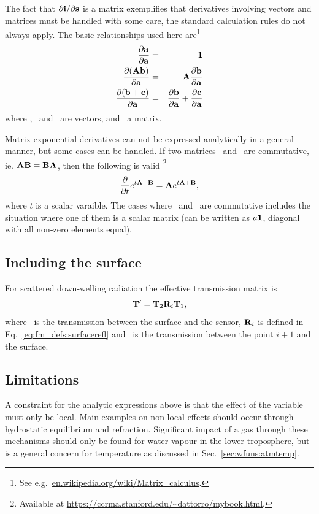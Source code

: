 The fact that $\partial\mathbf{i}/\partial{\bf s}$ is a matrix exemplifies that
derivatives involving vectors and matrices must be handled with some care, the
standard calculation rules do not always apply. The basic relationships used
here are\footnote{See e.g.\ \url{en.wikipedia.org/wiki/Matrix_calculus}.}
\begin{eqnarray}
  \frac{\partial\mathbf{a}}{\partial\mathbf{a}} &=& 
    \mathbf{1} \\
  \frac{\partial(\mathbf{A}\mathbf{b})}{\partial\mathbf{a}} &=& 
    \mathbf{A}\frac{\partial\mathbf{b}}{\partial\mathbf{a}} \\
  \frac{\partial(\mathbf{b}+\mathbf{c})}{\partial\mathbf{a}} &=& 
    \frac{\partial\mathbf{b}}{\partial\mathbf{a}}+
    \frac{\partial\mathbf{c}}{\partial\mathbf{a}}
\end{eqnarray}
where , \ and \ are vectors, and \ a
matrix.

Matrix exponential derivatives can not be expressed analytically in a general
manner, but some cases can be handled. If two matrices \ and
\ are commutative, ie. $\mathbf{A}\mathbf{B}=\mathbf{B}\mathbf{A}$,
then the following is valid \citep{Dattorro2011}\footnote{Available at
  \url{https://ccrma.stanford.edu/~dattorro/mybook.html}.}
\begin{equation}
  \label{eq:expmder}
  \frac{\partial}{\partial t} e^{t\mathbf{A}+\mathbf{B}} = 
       \mathbf{A}e^{t\mathbf{A}+\mathbf{B}},
\end{equation}
where $t$ is a scalar varaible.
The cases where \ and \ are commutative includes the
situation where one of them is a scalar matrix (can be written as $a\mathbf{1}$,
diagonal with all non-zero elements equal).



\subsection{Including the surface}
%
For scattered down-welling radiation the effective transmission matrix is
\begin{equation}
  \mathbf{T}' = \mathbf{T}_{2}\mathbf{R}_i\mathbf{T}_{1},
\end{equation}
where \ is the transmission between the surface and the sensor,
$\mathbf{R}_i$ is defined in Eq.~\ref{eq:fm_defs:surfacerefl} and
\ is the transmission between the point $i+1$ and the surface.


\subsection{Limitations}
\label{sec:wfuns:atmvars:limit}
%
A constraint for the analytic expressions above is that the effect of the
variable must only be local. Main examples on non-local effects should occur
through hydrostatic equilibrium and refraction. Significant impact of a gas
through these mechanisms should only be found for water vapour in the lower
troposphere, but is a general concern for temperature as discussed in
Sec.~\ref{sec:wfuns:atmtemp}.





